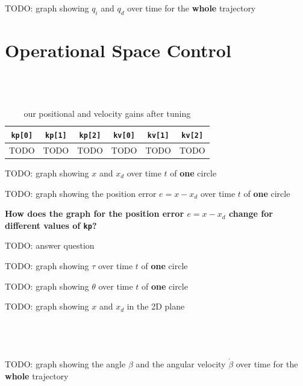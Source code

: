\documentclass[a4paper,10pt]{article}
\begin{document}
TODO: graph showing $q_i$ and $q_d$ over time for the \textbf{whole} trajectory

\newpage

\section{Operational Space Control}

\setcounter{subsection}{2}
\subsection{~}

\begin{table}[h!]
  \begin{center}
    \begin{tabular}{c|c|c|c|c|c}
      \texttt{kp[0]} & \texttt{kp[1]} & \texttt{kp[2]} & \texttt{kv[0]} & \texttt{kv[1]} & \texttt{kv[2]}\\\hline
      TODO & TODO & TODO & TODO & TODO & TODO
    \end{tabular}
    \caption{our positional and velocity gains after tuning}
  \end{center}
\end{table}

TODO: graph showing $x$ and $x_d$ over time $t$ of \textbf{one} circle

TODO: graph showing the position error $e = x - x_d$ over time $t$ of \textbf{one} circle

\textbf{How does the graph for the position error $e = x - x_d$ change for different values of \texttt{kp}?}

TODO: answer question

TODO: graph showing $\tau$ over time $t$ of \textbf{one} circle

TODO: graph showing $\theta$ over time $t$ of \textbf{one} circle

TODO: graph showing $x$ and $x_d$ in the 2D plane

\subsection{~}

TODO: graph showing the angle $\beta$ and the angular velocity $\dot{\beta}$ over time for the \textbf{whole} trajectory
\end{document}
